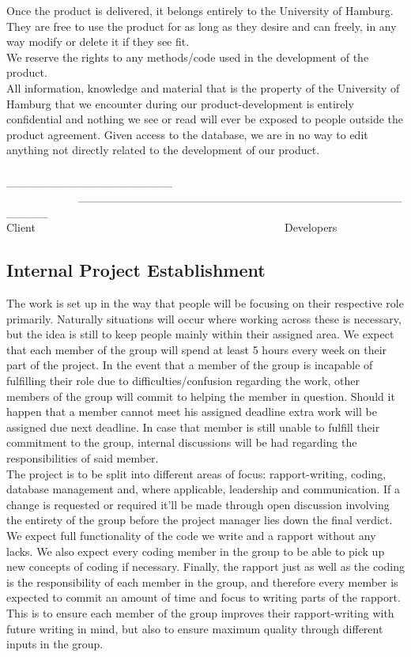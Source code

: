 \documentclass[12pt,a4paper]{article}
\begin{document}
Once the product is delivered, it belongs entirely to the University of Hamburg. They are free to use the product for as long as they desire and can freely, in any way modify or delete it if they see fit.\\
We reserve the rights to any methods/code used in the development of the product.\\
All information, knowledge and material that is the property of the University of Hamburg that we encounter during our product-development is entirely confidential and nothing we see or read will ever be exposed to people outside the product agreement.
Given access to the database, we are in no way to edit anything not directly related to the development of our product.\\\\


\_\_\_\_\_\_\_\_\_\_\_\_\_\_\_\_\_\_\_\_ ~~~~~~~~~~~~~\_\_\_\_\_\_\_\_\_\_\_\_\_\_\_\_\_\_\_\_\_\_\_\_\_\_\_\_\_\_\_\_\_\_\_\_\_\_\_\_\_\_\_\_\\
Client~~~~~~~~~~~~~~~~~~~~~~~~~~~~~~~~~~~~~~~~~~~~~Developers       

\newpage
\subsection{Internal Project Establishment}
The work is set up in the way that people will be focusing on their respective role primarily. Naturally situations will occur where working across these is necessary, but the idea is still to keep people mainly within their assigned area. We expect that each member of the group will spend at least 5 hours every week on their part of the project. In the event that a member of the group is incapable of fulfilling their role due to difficulties/confusion regarding the work, other members of the group will commit to helping the member in question. Should it happen that a member cannot meet his assigned deadline extra work will be assigned due next deadline. In case that member is still unable to fulfill their commitment to the group, internal discussions will be had regarding the responsibilities of said member. \\
The project is to be split into different areas of focus: rapport-writing, coding, database management and, where applicable, leadership and communication. If a change is requested or required it’ll be made through open discussion involving the entirety of the group before the project manager lies down the final verdict.\\
We expect full functionality of the code we write and a rapport without any lacks. We also expect every coding member in the group to be able to pick up new concepts of coding if necessary. Finally, the rapport just as well as the coding is the responsibility of each member in the group, and therefore every member is expected to commit an amount of time and focus to writing parts of the rapport. This is to ensure each member of the group improves their rapport-writing with future writing in mind, but also to ensure maximum quality through different inputs in the group.


                                                   
\end{document}

